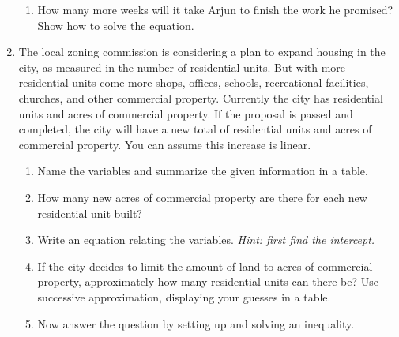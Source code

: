 \begin{enumerate}
\begin{enumerate}
\item How many more weeks will it take Arjun to finish the work he promised?  Show how to solve the equation. 
\vfill
\vfill
\end{enumerate} 

\newpage

\item The local zoning commission is considering a plan to expand housing in the city, as measured in the number of residential units.  But with more residential units come more shops, offices, schools, recreational facilities, churches, and other commercial property. Currently the city has  residential units and  acres of commercial property.  If the proposal is passed and completed, the city will have a new total of  residential units and  acres of commercial property.  You can assume this increase is linear.
\begin{enumerate}
\item Name the variables and summarize the given information in a table. 
\vfill
\item How many new acres of commercial property are there for each new residential unit built? 
\vfill
\item Write an equation relating the variables. \emph{Hint:  first find the intercept.}
\vfill
\vfill
\item If the city decides to limit the amount of land to  acres of commercial property, approximately how many residential units can there be?  Use successive approximation, displaying your guesses in a table.
\vfill
\item Now answer the question by setting up and solving an inequality. 
\vfill
\end{enumerate} 


\end{enumerate}
